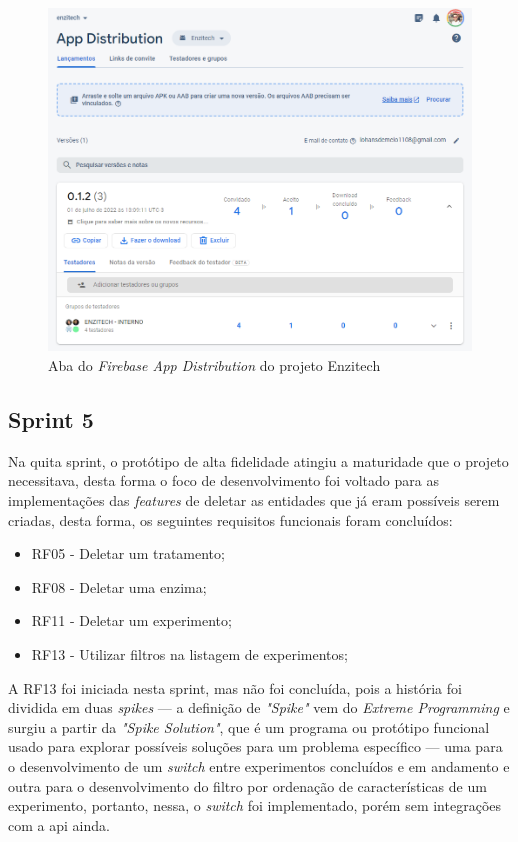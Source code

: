 \begin{figure}[H]
\centering
  \includegraphics[width=\columnwidth]{images/app_distribution.png}
  \caption{Aba do \textit{Firebase App Distribution} do projeto Enzitech}
  \label{fig:app_distribution}
\end{figure}
 
\subsection{Sprint 5}\label{ssec:sprint5}
Na quita sprint, o protótipo de alta fidelidade atingiu a maturidade que o projeto necessitava, desta forma o foco de desenvolvimento foi voltado para as implementações das \textit{features} de deletar as entidades que já eram possíveis serem criadas, desta forma, os seguintes requisitos funcionais foram concluídos:
\begin{itemize}
   \item RF05 - Deletar um tratamento;
   \item RF08 - Deletar uma enzima;
   \item RF11 - Deletar um experimento;
   \item RF13 - Utilizar filtros na listagem de experimentos;
 \end{itemize}

A RF13 foi iniciada nesta sprint, mas não foi concluída, pois a história foi dividida em duas \textit{spikes} — a definição de \textit{"Spike"} vem do \textit{Extreme Programming} e surgiu a partir da \textit{"Spike Solution"}, que é um programa ou protótipo funcional usado para explorar possíveis soluções para um problema específico — uma para o desenvolvimento de um \textit{switch} entre experimentos concluídos e em andamento e outra para o desenvolvimento do filtro por ordenação de características de um experimento, portanto, nessa, o \textit{switch} foi implementado, porém sem integrações com a \ac{api} ainda.

